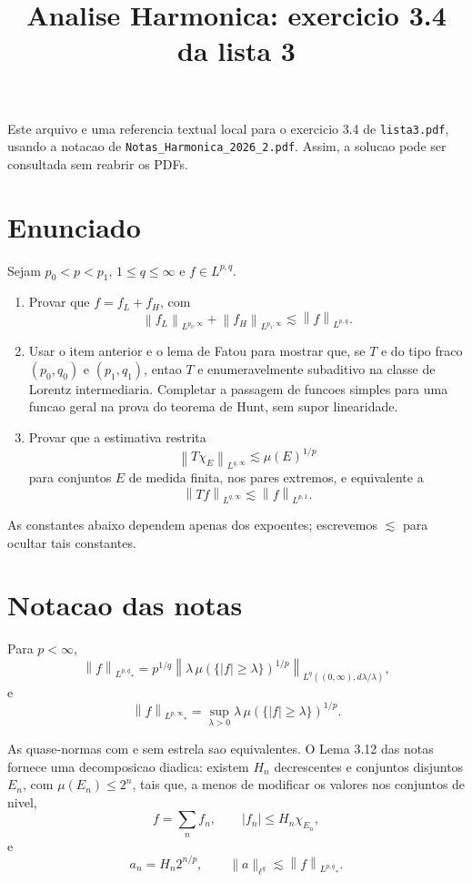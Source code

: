 \documentclass[12pt,a4paper]{article}
\title{Analise Harmonica: exercicio 3.4 da lista 3}
\author{}
\date{}
\newcommand{\norm}[2]{\left\|#1\right\|_{#2}}
\begin{document}
\maketitle

Este arquivo e uma referencia textual local para o exercicio 3.4 de
\texttt{lista3.pdf}, usando a notacao de \texttt{Notas\_Harmonica\_2026\_2.pdf}.
Assim, a solucao pode ser consultada sem reabrir os PDFs.

\section*{Enunciado}

Sejam $p_0<p<p_1$, $1\leq q\leq\infty$ e $f\in L^{p,q}$.

\begin{enumerate}
\item Provar que $f=f_L+f_H$, com
\[
\norm{f_L}{L^{p_0,\infty}}+\norm{f_H}{L^{p_1,\infty}}\lesssim \norm{f}{L^{p,q}}.
\]
\item Usar o item anterior e o lema de Fatou para mostrar que, se $T$ e do
tipo fraco $(p_0,q_0)$ e $(p_1,q_1)$, entao $T$ e enumeravelmente subaditivo
na classe de Lorentz intermediaria. Completar a passagem de funcoes simples
para uma funcao geral na prova do teorema de Hunt, sem supor linearidade.
\item Provar que a estimativa restrita
\[
\norm{T\chi_E}{L^{q,\infty}}\lesssim \mu(E)^{1/p}
\]
para conjuntos $E$ de medida finita, nos pares extremos, e equivalente a
\[
\norm{Tf}{L^{q,\infty}}\lesssim \norm{f}{L^{p,1}}.
\]
\end{enumerate}

As constantes abaixo dependem apenas dos expoentes; escrevemos $\lesssim$ para
ocultar tais constantes.

\section*{Notacao das notas}

Para $p<\infty$,
\[
\norm{f}{L^{p,q}}_* = p^{1/q}
\left\|\lambda\,\mu(\{|f|\geq\lambda\})^{1/p}\right\|_{L^q((0,\infty),d\lambda/\lambda)},
\]
e
\[
\norm{f}{L^{p,\infty}}_* =
\sup_{\lambda>0}\lambda\,\mu(\{|f|\geq\lambda\})^{1/p}.
\]

As quase-normas com e sem estrela sao equivalentes. O Lema 3.12 das notas
fornece uma decomposicao diadica: existem $H_n$ decrescentes e conjuntos
disjuntos $E_n$, com $\mu(E_n)\leq 2^n$, tais que, a menos de modificar os
valores nos conjuntos de nivel,
\[
f=\sum_n f_n, \qquad |f_n|\leq H_n\chi_{E_n},
\]
e
\[
a_n=H_n2^{n/p}, \qquad
\|a\|_{\ell^q}\lesssim \norm{f}{L^{p,q}}_*.
\]
\end{document}
